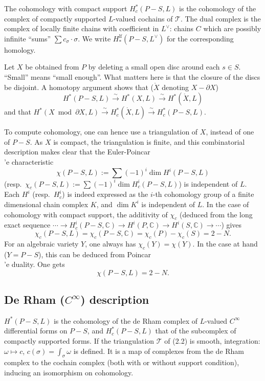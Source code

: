 \documentclass[12pt,a4paper]{article}
\theoremstyle{plain}
\theoremstyle{definition}
\theoremstyle{remark}
\newcommand{\CC}{\mathbb{C}}
\numberwithin{equation}{section}
\providecommand{\CC}{\mathbb{C}}
\begin{document}
The cohomology with compact support $H^*_c(P-S, L)$ is the cohomology of the complex of compactly supported $L$-valued cochains of $\mathscr{T}$. The dual complex is the complex of locally finite chains with coefficient in $L^\vee$: chains $C$ which are possibly infinite ``sums'' $\sum c_\sigma \cdot \sigma$. We write $H^{\mathrm{lf}}_*(P-S, L^\vee)$ for the corresponding homology.

Let $X$ be obtained from $P$ by deleting a small open disc around each $s \in S$. ``Small'' means ``small enough''. What matters here is that the closure of the discs be disjoint. A homotopy argument shows that ($\mathring{X}$ denoting $X - \partial X$)
\[
H^*(P-S, L) \xrightarrow{\sim} H^*(X, L) \xrightarrow{\sim} H^*(\mathring{X}, L)
\]
and that $H^*(X \bmod \partial X, L) \xrightarrow{\sim} H^*_c(\mathring{X}, L) \xrightarrow{\sim} H^*_c(P-S, L)$.

To compute cohomology, one can hence use a triangulation of $X$, instead of one of $P-S$. As $X$ is compact, the triangulation is finite, and this combinatorial description makes clear that the Euler-Poincar\\'e characteristic
\[
\chi(P-S, L) := \sum (-1)^i \dim H^i(P-S, L)
\]
(resp.\ $\chi_c(P-S, L) := \sum (-1)^i \dim H^i_c(P-S, L)$) is independent of $L$. Each $H^i$ (resp.\ $H^i_c$) is indeed expressed as the $i$-th cohomology group of a finite dimensional chain complex $K$, and $\dim K^i$ is independent of $L$. In the case of cohomology with compact support, the additivity of $\chi_c$ (deduced from the long exact sequence $\cdots \to H^i_c(P-S, \CC) \to H^i(P, \CC) \to H^i(S, \CC) \to \cdots$) gives
\begin{equation}\label{eq:2.2.1}
\chi_c(P-S, L) = \chi_c(P-S, \CC) = \chi_c(P) - \chi_c(S) = 2 - N.
\end{equation}
For an algebraic variety $Y$, one always has $\chi_c(Y) = \chi(Y)$. In the case at hand ($Y = P-S$), this can be deduced from Poincar\\'e duality. One gets
\begin{equation}\label{eq:2.2.2}
\chi(P-S, L) = 2 - N.
\end{equation}

\subsection{De Rham ($C^\infty$) description}
$H^*(P-S, L)$ is the cohomology of the de Rham complex of $L$-valued $C^\infty$ differential forms on $P-S$, and $H^*_c(P-S, L)$ that of the subcomplex of compactly supported forms. If the triangulation $\mathscr{T}$ of (2.2) is smooth, integration: $\omega \mapsto c$, $c(\sigma) = \int_\sigma \omega$ is defined. It is a map of complexes from the de Rham complex to the cochain complex (both with or without support condition), inducing an isomorphism on cohomology.
\end{document}
